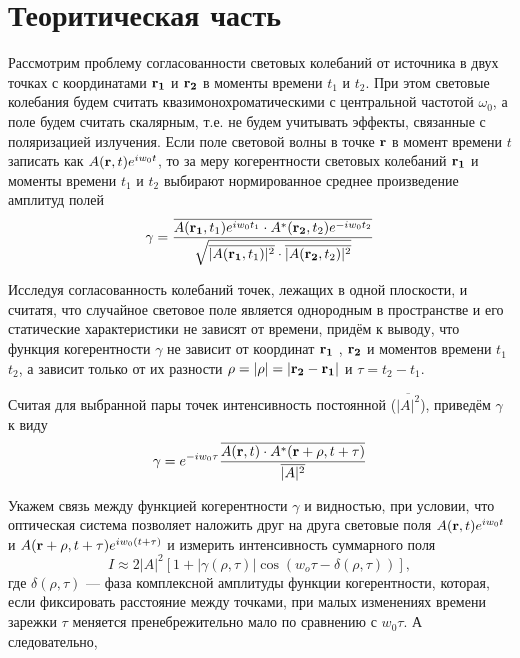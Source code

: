 \documentclass[12pt]{article}
\newcommand{\RF}{${\bf r_1}$ }
\newcommand{\RS}{${\bf r_2}$ }
\begin{document}
\section*{Теоритическая часть}
\par
	Рассмотрим проблему согласованности световых колебаний от источника в двух точках с координатами ${\bf r_1}$ и ${\bf r_2}$ в моменты времени $t_1$ и $t_2$. При этом световые колебания будем считать квазимонохроматическими с центральной частотой $\omega_0$, а поле будем считать скалярным, т.е. не будем учитывать эффекты, связанные с поляризацией излучения. Если поле световой волны в точке ${\bf r}$ в момент времени $t$ записать как $A({\bf r}, t) e^{iw_0t}$, то за меру когерентности световых колебаний \RF и  моменты времени $t_1$ и $t_2$ выбирают нормированное среднее произведение амплитуд полей
\begin{equation}
	\gamma = \frac{\overline{A({\bf r_1}, t_1) e^{iw_0t_1} \cdot A^{*}({\bf r_2}, t_2) e^{-iw_0t_2}}}{\sqrt{\overline{|A({\bf r_1}, t_1)|^2} \cdot {\overline{|A({\bf r_2}, t_2)|^2}}}}
\end{equation}
\par
	Исследуя согласованность колебаний точек, лежащих в одной плоскости, и считатя, что случайное световое поле является однородным в пространстве и его статические характеристики не зависят от времени, придём к выводу, что функция когерентности $\gamma$ не зависит от координат \RF, \RS и моментов времени $t_1$ $t_2$, а зависит только от их разности $\rho = |{\bf \rho}| = |{\bf r_2 - r_1}|$ и $\tau = t_2 - t_1$.
\par
	Считая для выбранной пары точек интенсивность постоянной ($\overline{|A|^2}$), приведём $\gamma$ к виду
\begin{equation}
	\gamma = e^{-i w_0 \tau} \frac{\overline{A({\bf r}, t) \cdot A^{*}({\bf r + \rho}, t + \tau)}}{\overline{|A|^2}}
\end{equation}
\par
	Укажем связь между функцией когерентности $\gamma$ и видностью, при условии, что оптическая система позволяет наложить друг на друга световые поля $A({\bf r}, t) e^{iw_0t}$ и $A({\bf r + \rho}, t + \tau) e^{iw_0(t + \tau)}$ и измерить интенсивность суммарного поля
\[
	I \approx 2 |A|^2 \left[1 + |\gamma(\rho, \tau)| \cos\left(w_o \tau - \delta(\rho, \tau) \right) \right],
\]
где $\delta(\rho, \tau)$ --- фаза комплексной амплитуды функции когерентности, которая, если фиксировать расстояние между точками, при малых изменениях времени зарежки $\tau$ меняется пренебрежительно мало по сравнению с $w_0 \tau$. А следовательно, 
\end{document}
